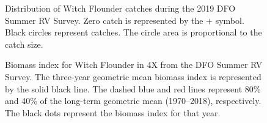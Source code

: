 \documentclass[11pt]{book}
\begin{document}
\begin{figure}[htb]

{\centering {} 

}

\caption{Distribution of Witch Flounder catches during the 2019 DFO Summer RV Survey. Zero catch is represented by the + symbol. Black circles represent catches. The circle area is proportional to the catch size.}\label{fig:55-map-witchflounder}
\end{figure}

\begin{figure}[htb]

{\centering {} 

}

\caption{Biomass index for Witch Flounder in 4X from the DFO Summer RV Survey. The three-year geometric mean biomass index is represented by the solid black line. The dashed blue and red lines represent 80\% and 40\% of the long-term geometric mean (1970--2018), respectively. The black dots represent the biomass index for that year.}\label{fig:56-fig-witchflounder-biomass4X}
\end{figure}
\end{document}
